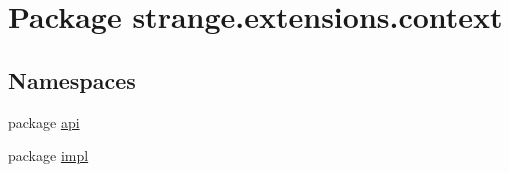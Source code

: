 \hypertarget{namespacestrange_1_1extensions_1_1context}{\section{Package strange.\-extensions.\-context}
\label{namespacestrange_1_1extensions_1_1context}
}
\subsection*{Namespaces}
\begin{DoxyCompactItemize}
\item 
package \hyperlink{namespacestrange_1_1extensions_1_1context_1_1api}{api}
\item 
package \hyperlink{namespacestrange_1_1extensions_1_1context_1_1impl}{impl}
\end{DoxyCompactItemize}
